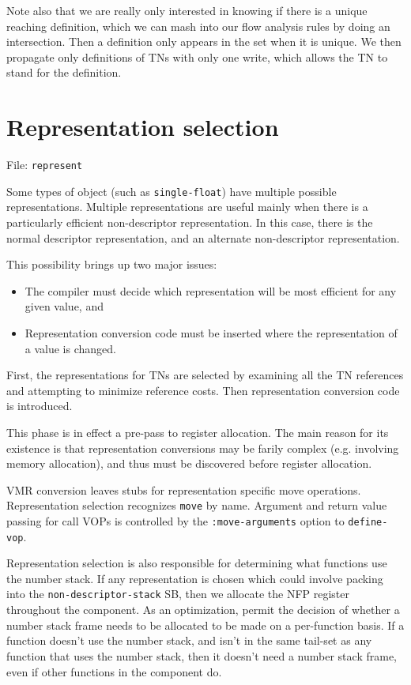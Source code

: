 Note also that we are really only interested in knowing if there is a
unique reaching definition, which we can mash into our flow analysis rules by
doing an intersection.  Then a definition only appears in the set when it is
unique.  We then propagate only definitions of TNs with only one write, which
allows the TN to stand for the definition.

\chapter{Representation selection}

File: {\tt represent}

Some types of object (such as {\tt single-float}) have multiple possible
representations.  Multiple representations are useful mainly when there is a
particularly efficient non-descriptor representation.  In this case, there is
the normal descriptor representation, and an alternate non-descriptor
representation.

This possibility brings up two major issues:
\begin{itemize}
\item The compiler must decide which representation will be most efficient for
any given value, and

\item Representation conversion code must be inserted where the representation
of a value is changed.
\end{itemize}
First, the representations for TNs are selected by examining all the TN
references and attempting to minimize reference costs.  Then representation
conversion code is introduced.

This phase is in effect a pre-pass to register allocation.  The main reason for
its existence is that representation conversions may be farily complex (e.g.
involving memory allocation), and thus must be discovered before register
allocation.


VMR conversion leaves stubs for representation specific move operations.
Representation selection recognizes {\tt move} by name.  Argument and return
value passing for call VOPs is controlled by the {\tt :move-arguments} option
to {\tt define-vop}.

Representation selection is also responsible for determining what functions use
the number stack.  If any representation is chosen which could involve packing
into the {\tt non-descriptor-stack} SB, then we allocate the NFP register
throughout the component.  As an optimization, permit the decision of whether a
number stack frame needs to be allocated to be made on a per-function basis.
If a function doesn't use the number stack, and isn't in the same tail-set as
any function that uses the number stack, then it doesn't need a number stack
frame, even if other functions in the component do.

